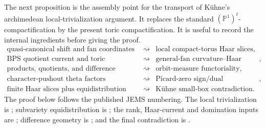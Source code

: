 \documentclass[10pt,a4paper]{amsart}
\theoremstyle{plain}
\theoremstyle{plain}
\numberwithin{equation}{section}
\begin{document}
The next proposition is the assembly point for the transport of K\"uhne's
archimedean local-trivialization argument.  It replaces the standard
\((\mathbb P^1)^t\)-compactification by the present toric compactification.
It is useful to record the internal ingredients before giving the proof.
\[
\begin{array}{ccl}
	\text{quasi-canonical shift and fan coordinates}
	&\rightsquigarrow&
	\text{local compact-torus Haar slices},\\
	\text{BPS quotient current and toric invariance}
	&\rightsquigarrow&
	\text{general-fan curvature--Haar formula},\\
	\text{products, quotients, and difference morphisms}
	&\rightsquigarrow&
	\text{orbit-measure functoriality},\\
	\text{character-pushout theta factors}
	&\rightsquigarrow&
	\text{Picard-zero sign/dual bookkeeping},\\
	\text{finite Haar slices plus equidistribution}
	&\rightsquigarrow&
	\text{K\"uhne small-box contradiction}.
\end{array}
\]
The proof below follows the published JEMS numbering.  The local
trivialization is \cite[Section~3.5, Lemma~3.3]{Ku1}; subvariety
equidistribution is \cite[Proposition~4.1 and Lemmas~4.2--4.6]{Ku1}; the rank,
Haar-current and domination inputs are \cite[Lemmas~5.1--5.3]{Ku1}; difference
geometry is \cite[Lemma~6.2]{Ku1}; and the final contradiction is
\cite[Proposition~6.1, especially equation~(6.2)]{Ku1}.
\end{document}

